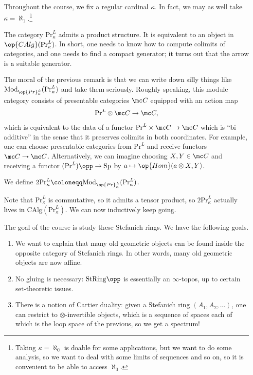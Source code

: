 \documentclass[../notes.tex]{subfiles}
\begin{document}
Throughout the course, we fix a regular cardinal $\kappa$. In fact, we may as well take $\kappa=\aleph_1$.\footnote{Taking $\kappa=\aleph_0$ is doable for some applications, but we want to do some analysis, so we want to deal with some limits of sequences and so on, so it is convenient to be able to access $\aleph_0$.}
\begin{remark}
	The category $\mathrm{Pr}_\kappa^L$ admits a product structure. It is equivalent to an object in $\op{CAlg}(\mathrm{Pr}_\kappa^L)$. In short, one needs to know how to compute colimits of categories, and one needs to find a compact generator; it turns out that the arrow is a suitable generator.
\end{remark}
The moral of the previous remark is that we can write down silly things like $\mathrm{Mod}_{\op{Pr}_\kappa^L}(\mathrm{Pr}_\kappa^L)$ and take them seriously. Roughly speaking, this module category consists of presentable categories $\mc C$ equipped with an action map
\[\mathrm{Pr}^L\otimes\mc C\to\mc C,\]
which is equivalent to the data of a functor $\mathrm{Pr}^L\times\mc C\to\mc C$ which is ``bi-additive'' in the sense that it preserves colimits in both coordinates. For example, one can choose presentable categories from $\mathrm{Pr}^L$ and receive functors $\mc C\to\mc C$. Alternatively, we can imagine choosing $X,Y\in\mc C$ and receiving a functor $(\mathrm{Pr}^L)\opp\to\mathrm{Sp}$ by $a\mapsto\op{Hom}(a\otimes X,Y)$.
\begin{notation}
	We define $2\mathrm{Pr}^L_\kappa\coloneqq\mathrm{Mod}_{\op{Pr}_\kappa^L}(\mathrm{Pr}_\kappa^L)$.
\end{notation}
Note that $\mathrm{Pr}^L_\kappa$ is commutative, so it admits a tensor product, so $2\mathrm{Pr}^L_\kappa$ actually lives in $\mathrm{CAlg}(\mathrm{Pr}^L_\kappa)$. We can now inductively keep going.

The goal of the course is study these Stefanich rings. We have the following goals.
\begin{enumerate}
	\item We want to explain that many old geometric objects can be found inside the opposite category of Stefanich rings. In other words, many old geometric objects are now affine.
	\item No gluing is necessary: $\mathrm{StRing}\opp$ is essentially an $\infty$-topos, up to certain set-theoretic issues.
	\item There is a notion of Cartier duality: given a Stefanich ring $(A_1,A_2,\ldots)$, one can restrict to $\otimes$-inver\-tible objects, which is a sequence of spaces each of which is the loop space of the previous, so we get a spectrum!
\end{enumerate}
\end{document}
